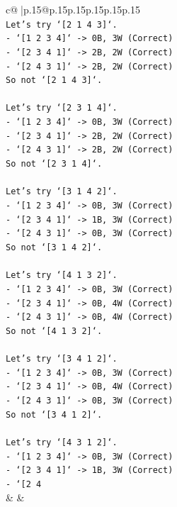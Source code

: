 \documentclass{article}
\begin{document}
{\begin{supertabular}{c@{$\;$}|p{.15\linewidth}@{}p{.15\linewidth}p{.15\linewidth}p{.15\linewidth}p{.15\linewidth}p{.15\linewidth}}
{{{\\ 
\texttt{Let's try `{[}2 1 4 3{]}`.} \\
\texttt{{-} `{[}1 2 3 4{]}` {-}> 0B, 3W (Correct)} \\
\texttt{{-} `{[}2 3 4 1{]}` {-}> 2B, 2W (Correct)} \\
\texttt{{-} `{[}2 4 3 1{]}` {-}> 2B, 2W (Correct)} \\
\texttt{So not `{[}2 1 4 3{]}`.} \\
\\ 
\texttt{Let's try `{[}2 3 1 4{]}`.} \\
\texttt{{-} `{[}1 2 3 4{]}` {-}> 0B, 3W (Correct)} \\
\texttt{{-} `{[}2 3 4 1{]}` {-}> 2B, 2W (Correct)} \\
\texttt{{-} `{[}2 4 3 1{]}` {-}> 2B, 2W (Correct)} \\
\texttt{So not `{[}2 3 1 4{]}`.} \\
\\ 
\texttt{Let's try `{[}3 1 4 2{]}`.} \\
\texttt{{-} `{[}1 2 3 4{]}` {-}> 0B, 3W (Correct)} \\
\texttt{{-} `{[}2 3 4 1{]}` {-}> 1B, 3W (Correct)} \\
\texttt{{-} `{[}2 4 3 1{]}` {-}> 0B, 3W (Correct)} \\
\texttt{So not `{[}3 1 4 2{]}`.} \\
\\ 
\texttt{Let's try `{[}4 1 3 2{]}`.} \\
\texttt{{-} `{[}1 2 3 4{]}` {-}> 0B, 3W (Correct)} \\
\texttt{{-} `{[}2 3 4 1{]}` {-}> 0B, 4W (Correct)} \\
\texttt{{-} `{[}2 4 3 1{]}` {-}> 0B, 4W (Correct)} \\
\texttt{So not `{[}4 1 3 2{]}`.} \\
\\ 
\texttt{Let's try `{[}3 4 1 2{]}`.} \\
\texttt{{-} `{[}1 2 3 4{]}` {-}> 0B, 3W (Correct)} \\
\texttt{{-} `{[}2 3 4 1{]}` {-}> 0B, 4W (Correct)} \\
\texttt{{-} `{[}2 4 3 1{]}` {-}> 0B, 3W (Correct)} \\
\texttt{So not `{[}3 4 1 2{]}`.} \\
\\ 
\texttt{Let's try `{[}4 3 1 2{]}`.} \\
\texttt{{-} `{[}1 2 3 4{]}` {-}> 0B, 3W (Correct)} \\
\texttt{{-} `{[}2 3 4 1{]}` {-}> 1B, 3W (Correct)} \\
\texttt{{-} `{[}2 4} \\
            }
        }
    }
    & & \\ \\


\end{supertabular}}
\end{document}
